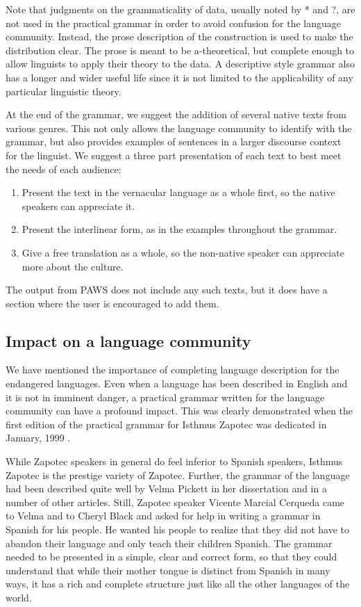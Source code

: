 Note that judgments on the grammaticality of data, usually noted by * and ?, are not used in the practical grammar in order to avoid confusion for the language community. Instead, the prose description of the construction is used to make the distribution clear. The prose is meant to be a-theoretical, but complete enough to allow linguists to apply their theory to the data. A descriptive style grammar also has a longer and wider useful life since it is not limited to the applicability of any particular linguistic theory.

At the end of the grammar, we suggest the addition of several native texts from various genres. This not only allows the language community to identify with the grammar, but also provides examples of sentences in a larger discourse context for the linguist. We suggest a three part presentation of each text to best meet the needs of each audience: 
 
\begin{enumerate}
\item Present the text in the vernacular language as a whole first, so the native speakers can appreciate it. 

\item Present the interlinear form, as in the examples throughout the grammar. 

\item Give a free translation as a whole, so the non-native speaker can appreciate more about the culture. 
\end{enumerate}

The output from {PAWS} does not include any such texts, but it does have a section where the user is encouraged to add them.

\subsection{Impact on a language community}\label{sPracticalExperience}
We have mentioned the importance of completing language description for the endangered languages. Even when a language has been described in English and it is not in imminent danger, a practical grammar written for the language community can have a profound impact. This was clearly demonstrated when the first edition of the practical grammar for Isthmus Zapotec was dedicated in January, 1999 \citep{rPickettBlackMarcial1st}.

While Zapotec speakers in general do feel inferior to Spanish speakers, Isthmus Zapotec is the prestige variety of Zapotec. Further, the grammar of the language had been described quite well by Velma Pickett in her dissertation \citep{rPickettDiss} and in a number of other articles. Still, Zapotec speaker Vicente Marcial Cerqueda came to Velma and to Cheryl Black and asked for help in writing a grammar in Spanish for his people. He wanted his people to realize that they did not have to abandon their language and only teach their children Spanish. The grammar needed to be presented in a simple, clear and correct form, so that they could understand that while their mother tongue is distinct from Spanish in many ways, it has a rich and complete structure just like all the other languages of the world.

